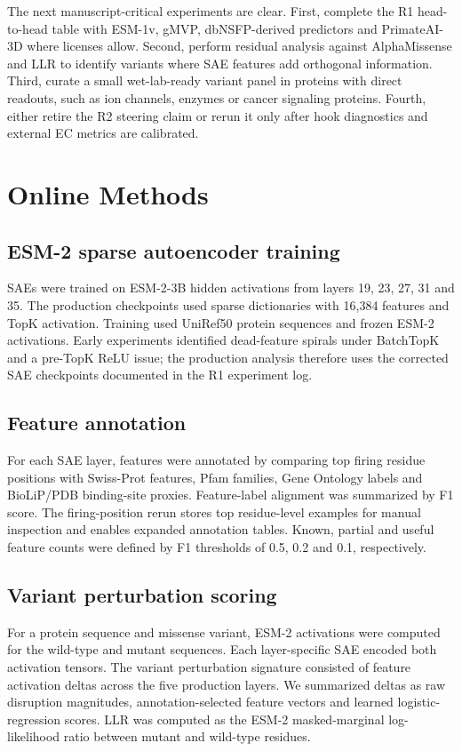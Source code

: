 \documentclass[pdflatex,sn-nature]{sn-jnl}
\begin{document}
The next manuscript-critical experiments are clear. First, complete the R1 head-to-head table with ESM-1v, gMVP, dbNSFP-derived predictors and PrimateAI-3D where licenses allow. Second, perform residual analysis against AlphaMissense and LLR to identify variants where SAE features add orthogonal information. Third, curate a small wet-lab-ready variant panel in proteins with direct readouts, such as ion channels, enzymes or cancer signaling proteins. Fourth, either retire the R2 steering claim or rerun it only after hook diagnostics and external EC metrics are calibrated.

\section{Online Methods}\label{sec:methods}

\subsection{ESM-2 sparse autoencoder training}

SAEs were trained on ESM-2-3B hidden activations from layers 19, 23, 27, 31 and 35. The production checkpoints used sparse dictionaries with 16,384 features and TopK activation. Training used UniRef50 protein sequences and frozen ESM-2 activations. Early experiments identified dead-feature spirals under BatchTopK and a pre-TopK ReLU issue; the production analysis therefore uses the corrected SAE checkpoints documented in the R1 experiment log.

\subsection{Feature annotation}

For each SAE layer, features were annotated by comparing top firing residue positions with Swiss-Prot features, Pfam families, Gene Ontology labels and BioLiP/PDB binding-site proxies. Feature-label alignment was summarized by F1 score. The firing-position rerun stores top residue-level examples for manual inspection and enables expanded annotation tables. Known, partial and useful feature counts were defined by F1 thresholds of 0.5, 0.2 and 0.1, respectively.

\subsection{Variant perturbation scoring}

For a protein sequence and missense variant, ESM-2 activations were computed for the wild-type and mutant sequences. Each layer-specific SAE encoded both activation tensors. The variant perturbation signature consisted of feature activation deltas across the five production layers. We summarized deltas as raw disruption magnitudes, annotation-selected feature vectors and learned logistic-regression scores. LLR was computed as the ESM-2 masked-marginal log-likelihood ratio between mutant and wild-type residues.
\end{document}
